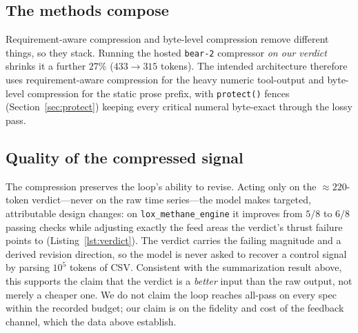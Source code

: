 \documentclass[10pt,twocolumn]{article}
\begin{document}
\begin{table}[t]
\centering\small
\caption{One iteration of \texttt{lox\_methane\_engine}, measured in the
byte-level compressor's own tokenizer. ``keeps actual?'' is whether the
decision-relevant failing value ($1136.79$~N) survives.}
\label{tab:h2h}
\setlength{\tabcolsep}{4pt}
\end{table}

\subsection{The methods compose}

Requirement-aware compression and byte-level compression remove different things, so
they stack. Running the hosted \texttt{bear-2} compressor \emph{on our verdict}
shrinks it a further $27\%$ ($433\to315$ tokens). The intended architecture
therefore uses requirement-aware compression for the heavy numeric tool-output and
byte-level compression for the static prose prefix, with \texttt{protect()} fences
(Section~\ref{sec:protect}) keeping every critical numeral byte-exact through the
lossy pass.

\subsection{Quality of the compressed signal}

The compression preserves the loop's ability to revise. Acting only on the
$\approx\!220$-token verdict---never on the raw time series---the model makes
targeted, attributable design changes: on \texttt{lox\_methane\_engine} it improves
from $5/8$ to $6/8$ passing checks while adjusting exactly the feed areas the
verdict's thrust failure points to (Listing~\ref{lst:verdict}). The verdict carries
the failing magnitude and a derived revision direction, so the model is never asked
to recover a control signal by parsing $10^5$ tokens of CSV. Consistent with the
summarization result above, this supports the claim that the verdict is a
\emph{better} input than the raw output, not merely a cheaper one. We do not claim
the loop reaches all-pass on every spec within the recorded budget; our claim is on
the fidelity and cost of the feedback channel, which the data above establish.
\end{document}
